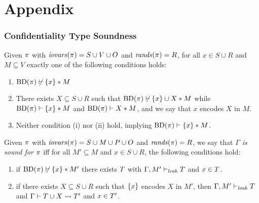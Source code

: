 \section*{Appendix}

\subsubsection{Confidentiality Type Soundness}


\begin{lemma}
  \label{lemma-interference}
  Given $\pi$ with $\mathit{iovars}(\pi) = S \cup V \cup O$ and $\mathit{rands}(\pi) = R$,
  for all $x \in S \cup R$ and $M \subseteq V$ exactly one of the following conditions holds:
  \begin{enumerate}[\hspace{5mm}i.]
  \item $\mathrm{BD}(\pi) \not\vdash \{ x \} * M$
  \item There exists $X \subseteq S \cup R$ such that
    $\mathrm{BD}(\pi) \not\vdash \{ x \} \cup X * M$ while
    $\mathrm{BD}(\pi) \vdash \{ x \} * M$ and $\mathrm{BD}(\pi) \vdash X * M$,
    and we say that $x$ encodes $X$ in $M$.
  \item Neither condition (i) nor (ii) hold, implying $\mathrm{BD}(\pi) \vdash \{ x \} * M$.
  \end{enumerate}
\end{lemma}


\begin{definition}
  \label{definition-sound}
  Given $\pi$ with $\mathit{iovars}(\pi) = S \cup M \cup P \cup O$
  and $\mathit{rands}(\pi) = R$, we say that
  \emph{$\Gamma$ is sound for $\pi$} iff for all $M' \subseteq M$
      and $x \in S \cup R$, the following
      conditions hold:
  \begin{enumerate}[\hspace{5mm}i.]
  \item  if $\mathrm{BD}(\pi) \not\vdash \{ x \} * M'$
    there exists $T$ with $\Gamma,M' \vdash_{\mathit{leak}} T$ and $x \in T$.
    \item  if there exists  $X \subseteq S \cup R$ such that
      $\{ x \}$ encodes $X$ in $M'$, 
      then $\Gamma,M' \vdash_{\mathit{leak}} T$ and
      $\Gamma \vdash T \cup X \leadsto T'$ and
      $x \in T'$.
  \end{enumerate}
\end{definition}

